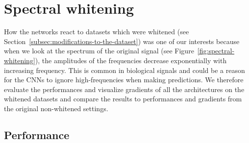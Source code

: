 \section{Spectral whitening}\label{sec:spectral-whitening}

How the networks react to datasets which were whitened (see Section~\ref{subsec:modifications-to-the-dataset}) was one of our interests because when we look at the spectrum of the original signal (see Figure~\ref{fig:spectral-whitening}), the amplitudes of the frequencies decrease exponentially with increasing frequency.
This is common in biological signals and could be a reason for the CNNs to ignore high-frequencies when making predictions.
We therefore evaluate the performances and visualize gradients of all the architectures on the whitened datasets and compare the results to performances and gradients from the original non-whitened settings. 

\subsection{Performance}\label{subsec:pw-performance}

